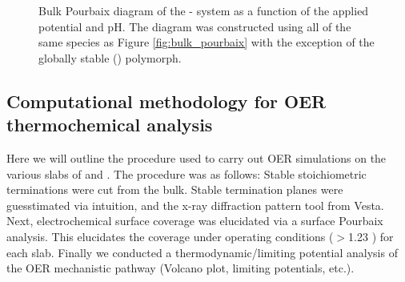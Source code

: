 \begin{figure}[!htb]
\centering
{}
\caption{\label{fig:bulk_pourbaix_wo_alpha}
%
Bulk Pourbaix diagram of the - system as a function of the applied potential and pH.
%
The diagram was constructed using all of the same species as Figure \ref{fig:bulk_pourbaix} with the exception of the globally stable \IrOthree (\aIrOthree) polymorph.
}
\end{figure}


\subsection{Computational methodology for OER thermochemical analysis}
%
%
Here we will outline the procedure used to carry out OER simulations on the various slabs of \IrOtwo and \IrOthree.
%
The procedure was as follows:
%
Stable stoichiometric terminations were cut from the bulk.
%
Stable termination planes were guesstimated via intuition, and the x-ray diffraction pattern tool from Vesta.
%
Next, electrochemical surface coverage was elucidated via a surface Pourbaix analysis.
%
This elucidates the coverage under operating conditions ($>$\num{1.23} \VRHE) for each slab.
%
Finally we conducted a thermodynamic/limiting potential analysis of the OER mechanistic pathway (Volcano plot, limiting potentials, etc.).


